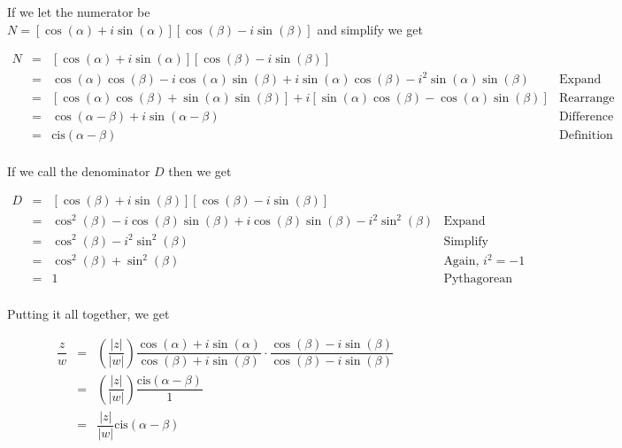 \documentclass{ximera}
\begin{document}
If we let the numerator be $N = \left[\cos(\alpha) + i \sin(\alpha)\right] \left[\cos(\beta) - i \sin(\beta)\right]$ and simplify we get

\[ \begin{array}{rcll}
N & = & \left[\cos(\alpha) + i \sin(\alpha)\right] \left[\cos(\beta) - i \sin(\beta)\right] & \\ [3pt]
  & = & \cos(\alpha)\cos(\beta)-i\cos(\alpha)\sin(\beta)  + i \sin(\alpha)\cos(\beta) - i^2 \sin(\alpha)\sin(\beta) & \text{Expand} \\[3pt]
	& = & \left[\cos(\alpha)\cos(\beta)+\sin(\alpha)\sin(\beta)\right] + i\left[\sin(\alpha)\cos(\beta) -\cos(\alpha)\sin(\beta)  \right] & \text{Rearrange and Factor} \\[3pt]
	& = & \cos(\alpha - \beta) + i \sin(\alpha - \beta)  & \text{Difference Identities}  \\ [3pt]
	& = & \text{cis}(\alpha - \beta)& \text{Definition of `cis'} \\ \end{array} \]
	
If we call the denominator $D$ then we get

\[ \begin{array}{rcll}
D & = & \left[\cos(\beta) + i\sin(\beta)\right]\left[\cos(\beta) - i\sin(\beta)\right] & \\ [3pt]
  & = & \cos^{2}(\beta) - i\cos(\beta)\sin(\beta) + i\cos(\beta)\sin(\beta) - i^2 \sin^{2}(\beta) & \text{Expand}  \\[3pt]
  & = & \cos^{2}(\beta) - i^2 \sin^{2}(\beta) & \text{Simplify}  \\[3pt]
	& = & \cos^{2}(\beta) + \sin^{2}(\beta) &  \text{Again, $i^{2} = -1$}\\[3pt]
	& = & 	1  & \text{Pythagorean Identity} \\ \end{array} \]
																																							 
Putting it all together, we get

\[ \begin{array}{rcll}

\dfrac{z}{w} & = & \left( \dfrac{|z|}{|w|}\right) \dfrac{\cos(\alpha) + i \sin(\alpha)}{\cos(\beta) + i \sin(\beta)} \cdot \dfrac{\cos(\beta) - i \sin(\beta)}{\cos(\beta) - i \sin(\beta)} & \\[8pt]
						 & = & \left( \dfrac{|z|}{|w|}\right) \dfrac{\text{cis}(\alpha - \beta)}{1}  &  \\ 	[8pt]	 
						 & = &  \dfrac{|z|}{|w|} \text{cis}(\alpha - \beta) \\ \end{array}\]
\end{document}
